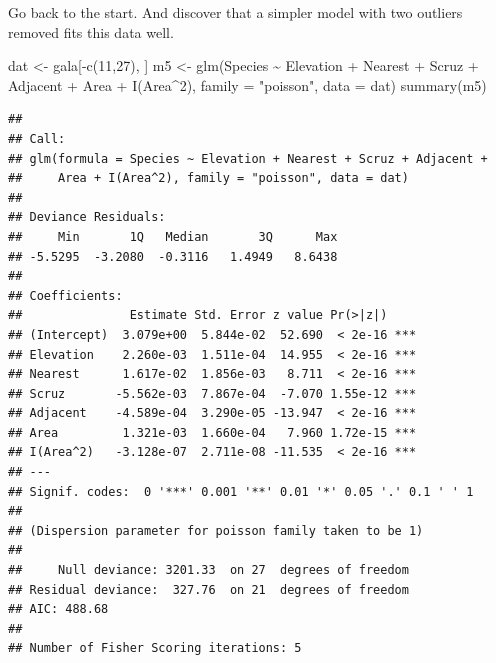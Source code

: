 \documentclass[
  ignorenonframetext,
]{beamer}
\newenvironment{Shaded}{\begin{snugshade}}{\end{snugshade}}
\newcommand{\AttributeTok}[1]{\textcolor[rgb]{0.77,0.63,0.00}{#1}}
\newcommand{\DecValTok}[1]{\textcolor[rgb]{0.00,0.00,0.81}{#1}}
\newcommand{\FunctionTok}[1]{\textcolor[rgb]{0.00,0.00,0.00}{#1}}
\newcommand{\NormalTok}[1]{#1}
\newcommand{\OtherTok}[1]{\textcolor[rgb]{0.56,0.35,0.01}{#1}}
\newcommand{\SpecialCharTok}[1]{\textcolor[rgb]{0.00,0.00,0.00}{#1}}
\newcommand{\StringTok}[1]{\textcolor[rgb]{0.31,0.60,0.02}{#1}}
\begin{document}
\begin{frame}[fragile]{}
\protect\hypertarget{section-20}{}
Go back to the start. And discover that a simpler model with two
outliers removed fits this data well.

\vspace{12pt}
\tiny

\begin{Shaded}
\begin{Highlighting}[]
\NormalTok{dat }\OtherTok{\textless{}{-}}\NormalTok{ gala[}\SpecialCharTok{{-}}\FunctionTok{c}\NormalTok{(}\DecValTok{11}\NormalTok{,}\DecValTok{27}\NormalTok{), ]}
\NormalTok{m5 }\OtherTok{\textless{}{-}} \FunctionTok{glm}\NormalTok{(Species }\SpecialCharTok{\textasciitilde{}}\NormalTok{ Elevation }\SpecialCharTok{+}\NormalTok{ Nearest }\SpecialCharTok{+}\NormalTok{ Scruz }\SpecialCharTok{+}\NormalTok{ Adjacent }\SpecialCharTok{+}\NormalTok{ Area }\SpecialCharTok{+} \FunctionTok{I}\NormalTok{(Area}\SpecialCharTok{\^{}}\DecValTok{2}\NormalTok{), }
          \AttributeTok{family =} \StringTok{"poisson"}\NormalTok{, }\AttributeTok{data =}\NormalTok{ dat)}
\FunctionTok{summary}\NormalTok{(m5)}
\end{Highlighting}
\end{Shaded}

\begin{verbatim}
## 
## Call:
## glm(formula = Species ~ Elevation + Nearest + Scruz + Adjacent + 
##     Area + I(Area^2), family = "poisson", data = dat)
## 
## Deviance Residuals: 
##     Min       1Q   Median       3Q      Max  
## -5.5295  -3.2080  -0.3116   1.4949   8.6438  
## 
## Coefficients:
##               Estimate Std. Error z value Pr(>|z|)    
## (Intercept)  3.079e+00  5.844e-02  52.690  < 2e-16 ***
## Elevation    2.260e-03  1.511e-04  14.955  < 2e-16 ***
## Nearest      1.617e-02  1.856e-03   8.711  < 2e-16 ***
## Scruz       -5.562e-03  7.867e-04  -7.070 1.55e-12 ***
## Adjacent    -4.589e-04  3.290e-05 -13.947  < 2e-16 ***
## Area         1.321e-03  1.660e-04   7.960 1.72e-15 ***
## I(Area^2)   -3.128e-07  2.711e-08 -11.535  < 2e-16 ***
## ---
## Signif. codes:  0 '***' 0.001 '**' 0.01 '*' 0.05 '.' 0.1 ' ' 1
## 
## (Dispersion parameter for poisson family taken to be 1)
## 
##     Null deviance: 3201.33  on 27  degrees of freedom
## Residual deviance:  327.76  on 21  degrees of freedom
## AIC: 488.68
## 
## Number of Fisher Scoring iterations: 5
\end{verbatim}
\end{frame}
\end{document}
